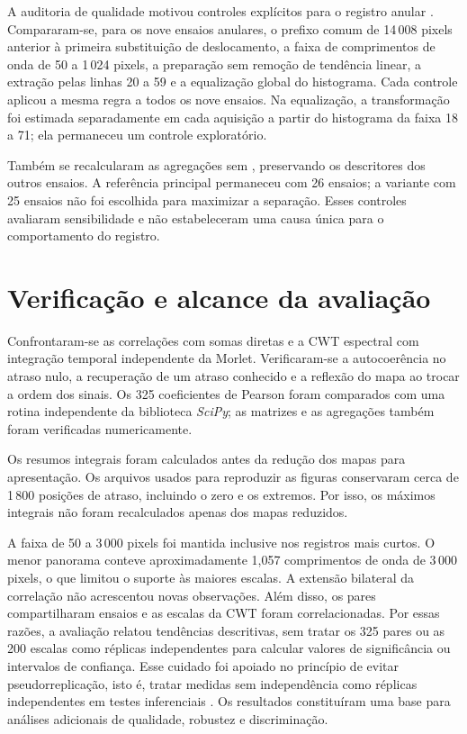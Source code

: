 A auditoria de qualidade motivou controles explícitos para o registro anular
. Compararam-se, para os nove ensaios anulares, o prefixo comum
de 14\,008 pixels anterior à primeira substituição de deslocamento, a faixa de
comprimentos de onda de 50 a 1\,024 pixels, a preparação sem remoção de tendência
linear, a extração pelas linhas 20 a 59 e a equalização global do histograma.
Cada controle aplicou a mesma regra a todos os nove ensaios. Na equalização,
a transformação foi estimada separadamente em cada aquisição a partir do
histograma da faixa 18 a 71; ela permaneceu um controle exploratório.

Também se recalcularam as agregações sem , preservando os
descritores dos outros ensaios. A referência principal permaneceu com 26 ensaios;
a variante com 25 ensaios não foi escolhida para maximizar a separação. Esses
controles avaliaram sensibilidade e não estabeleceram uma causa única para o
comportamento do registro.

\section{Verificação e alcance da avaliação}\label{sec:met-verificacao}

Confrontaram-se as correlações com somas diretas e a CWT espectral com integração
temporal independente da Morlet. Verificaram-se a autocoerência no atraso nulo,
a recuperação de um atraso conhecido e a reflexão do mapa ao trocar a ordem dos
sinais. Os 325 coeficientes de Pearson foram comparados com uma rotina
independente da biblioteca \textit{SciPy}; as matrizes e as agregações também
foram verificadas numericamente.

Os resumos integrais foram calculados antes da redução dos mapas para
apresentação. Os arquivos usados para reproduzir as figuras conservaram cerca de
1\,800 posições de atraso, incluindo o zero e os extremos. Por isso, os máximos
integrais não foram recalculados apenas dos mapas reduzidos.

A faixa de 50 a 3\,000 pixels foi mantida inclusive nos registros mais curtos.
O menor panorama conteve aproximadamente 1,057 comprimentos de onda de
3\,000 pixels, o que limitou o suporte às maiores escalas. A extensão bilateral
da correlação não acrescentou novas observações. Além disso, os pares
compartilharam ensaios e as escalas da CWT foram correlacionadas. Por essas
razões, a avaliação relatou tendências descritivas, sem tratar os 325 pares ou
as 200 escalas como réplicas independentes para calcular valores de significância
ou intervalos de confiança. Esse cuidado foi apoiado no princípio de evitar
pseudorreplicação, isto é, tratar medidas sem independência como réplicas
independentes em testes inferenciais \cite{hurlbert1984}.
Os resultados constituíram uma base para análises
adicionais de qualidade, robustez e discriminação.
